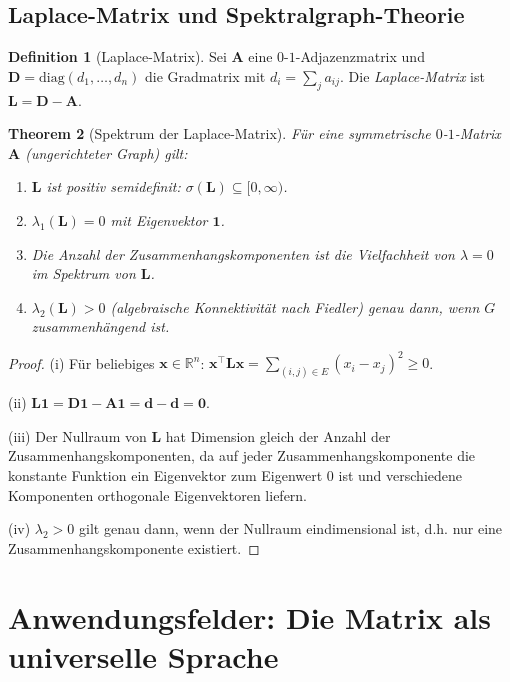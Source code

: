 ﻿\documentclass[12pt, a4paper]{article}
\newtheorem{theorem}{Theorem}[section]
\theoremstyle{definition}
\newtheorem{definition}[theorem]{Definition}
\theoremstyle{remark}
\newcommand{\R}{\mathbb{R}}
\newcommand{\vA}{\bm{A}}
\newcommand{\vD}{\bm{D}}
\newcommand{\vL}{\bm{L}}
\newcommand{\T}{\top}
\newcommand{\spec}{\sigma}
\newcommand{\diag}{\mathrm{diag}}
\begin{document}
\subsection{Laplace-Matrix und Spektralgraph-Theorie}
\label{subsec:laplace}

\begin{definition}[Laplace-Matrix]
Sei $\vA$ eine $0$-$1$-Adjazenzmatrix und $\vD = \diag(d_1,\ldots,d_n)$
die Gradmatrix mit $d_i = \sum_j a_{ij}$. Die \emph{Laplace-Matrix} ist
$\vL = \vD - \vA$.
\end{definition}

\begin{theorem}[Spektrum der Laplace-Matrix]
\label{thm:laplace}
Für eine symmetrische $0$-$1$-Matrix $\vA$ (ungerichteter Graph) gilt:
\begin{enumerate}[label=(\roman*)]
  \item $\vL$ ist positiv semidefinit: $\spec(\vL) \subseteq [0,\infty)$.
  \item $\lambda_1(\vL) = 0$ mit Eigenvektor $\mathbf{1}$.
  \item Die Anzahl der Zusammenhangskomponenten ist die Vielfachheit
    von $\lambda = 0$ im Spektrum von $\vL$.
  \item $\lambda_2(\vL) > 0$ (algebraische Konnektivität nach Fiedler)
    genau dann, wenn $G$ zusammenhängend ist.
\end{enumerate}
\end{theorem}

\begin{proof}
(i) Für beliebiges $\bm{x} \in \R^n$:
$\bm{x}^\T \vL \bm{x} = \sum_{(i,j)\in E}(x_i - x_j)^2 \geq 0$.

(ii) $\vL \mathbf{1} = \vD\mathbf{1} - \vA\mathbf{1} = \bm{d} - \bm{d} = \mathbf{0}$.

(iii) Der Nullraum von $\vL$ hat Dimension gleich der Anzahl der
Zusammenhangskomponenten, da auf jeder Zusammenhangskomponente
die konstante Funktion ein Eigenvektor zum Eigenwert 0 ist und
verschiedene Komponenten orthogonale Eigenvektoren liefern.

(iv) $\lambda_2 > 0$ gilt genau dann, wenn der Nullraum eindimensional
ist, d.h. nur eine Zusammenhangskomponente existiert.
\end{proof}

\section{Anwendungsfelder: Die Matrix als universelle Sprache}
\label{sec:anwendungen}
\end{document}
